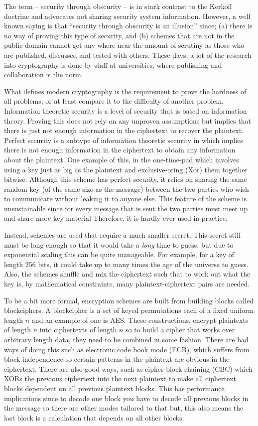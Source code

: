 \documentclass[ %
                    author={Samuel Russell},
                supervisor={Prof. Bogdan Warinschi},
                    degree={MEng},
                     title={Innocuous Ciphertexts},
                  subtitle={The DE-CENSOR Scheme},
                      type={Research},
                      year={2018} ]{dissertation}
\begin{document}
The term -- security through obscurity -- is in stark contrast to the Kerkoff doctrine and advocates not sharing security system information.
However, a well known saying is that ``security through obscurity is an illusion'' since; (a) there is no way of proving this type of security, and (b) schemes that are not in the public domain cannot get any where near the amount of scrutiny as those who are published, discussed and tested with others.
These days, a lot of the research into cryptography is done by staff at universities, where publishing and collaboration is the norm.

What defines modern cryptography is the requirement to prove the hardness of all problems, or at least compare it to the difficulty of another problem.
Information theoretic security is a level of security that is based on information theory.
Proving this does not rely on any unproven assumptions but implies that there is just not enough information in the ciphertext to recover the plaintext.
Perfect security is a subtype of information theoretic security in which implies there is not enough information in the ciphertext to obtain any information about the plaintext.
One example of this, in the one-time-pad which involves using a key just as big as the plaintext and exclusive-oring (Xor) them together bitwise.
Although this scheme has perfect security, it relies on sharing the same random key (of the same size as the message) between the two parties who wish to communicate without leaking it to anyone else.
This feature of the scheme is unsustainable since for every message that is sent the two parties must meet up and share more key material
Therefore, it is hardly ever used in practice.

Instead, schemes are used that require a much smaller secret.
This secret still must be long enough so that it would take a \textit{long} time to guess, but due to exponential scaling this can be quite manageable.
For example, for a key of length 256 bits, it could take up to many times the age of the universe to guess.
Also, the schemes shuffle and mix the ciphertext such that to work out what the key is, by mathematical constraints, many plaintext-ciphertext pairs are needed.

To be a bit more formal, encryption schemes are built from building blocks called blockciphers.
A blockcipher is a set of keyed permutations each of a fixed uniform length $n$ and an example of one is AES.
These constructions, encrypt plaintexts of length $n$ into ciphertexts of length $n$ so to build a cipher that works over arbitrary length data, they need to be combined in some fashion.
There are bad ways of doing this such as electronic code book mode (ECB), which suffers from block independence so certain patterns in the plaintext are obvious in the ciphertext.
There are also good ways, such as cipher block chaining (CBC) which XORs the previous ciphertext into the next plaintext to make all ciphertext blocks dependent on all previous plaintext blocks.
This has performance implications since to decode one block you have to decode all previous blocks in the message so there are other modes tailored to that but, this also means the last block is a calculation that depends on all other blocks.
\end{document}
